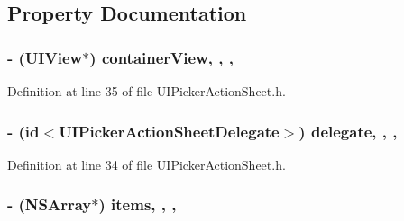 \subsection{Property Documentation}
\hypertarget{interface_u_i_picker_action_sheet_a0fc6fa5c94cc4d73bdeeec14d4b428c8}{
\subsubsection[{container\-View}]{\setlength{\rightskip}{0pt plus 5cm}-\/ (U\-I\-View$\ast$) container\-View\hspace{0.3cm}{\ttfamily [read]}, {\ttfamily [write]}, {\ttfamily [nonatomic]}, {\ttfamily [strong]}}}\label{interface_u_i_picker_action_sheet_a0fc6fa5c94cc4d73bdeeec14d4b428c8}


Definition at line 35 of file U\-I\-Picker\-Action\-Sheet.\-h.

\hypertarget{interface_u_i_picker_action_sheet_a322a2a2f827adbecbe50a56915e3e83c}{
\subsubsection[{delegate}]{\setlength{\rightskip}{0pt plus 5cm}-\/ (id$<${\bf U\-I\-Picker\-Action\-Sheet\-Delegate}$>$) delegate\hspace{0.3cm}{\ttfamily [read]}, {\ttfamily [write]}, {\ttfamily [nonatomic]}, {\ttfamily [assign]}}}\label{interface_u_i_picker_action_sheet_a322a2a2f827adbecbe50a56915e3e83c}


Definition at line 34 of file U\-I\-Picker\-Action\-Sheet.\-h.

\hypertarget{interface_u_i_picker_action_sheet_a89ee574615afe8a3270aa1586fdf3a3e}{
\subsubsection[{items}]{\setlength{\rightskip}{0pt plus 5cm}-\/ (N\-S\-Array$\ast$) items\hspace{0.3cm}{\ttfamily [read]}, {\ttfamily [write]}, {\ttfamily [nonatomic]}, {\ttfamily [strong]}}}\label{interface_u_i_picker_action_sheet_a89ee574615afe8a3270aa1586fdf3a3e}


